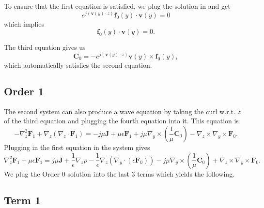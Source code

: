 \documentclass{article}
\theoremstyle{plain}
\begin{document}
To ensure that the first equation is satisfied, we plug the solution in and get
\begin{equation}
	e^{j\left(\mathbf{v}(y)\cdot z\right)}\mathbf{f}_0(y)\cdot\mathbf{v}(y) = 0
\end{equation}
which implies
\begin{equation}
	\mathbf{f}_0(y)\cdot\mathbf{v}(y) = 0.
\end{equation}

The third equation gives us
\begin{equation}
	\mathbf{C}_0 = -e^{j\left(\mathbf{v}(y)\cdot z\right)}\mathbf{v}(y)\times\mathbf{f}_0(y),
\end{equation}
which automatically satisfies the second equation.



\subsection{Order 1}

The second system can also produce a wave equation by taking the curl w.r.t. $z$ of the third equation and plugging the fourth equation into it. This equation is
\begin{equation}
	-\nabla_z^2\mathbf{F}_1 + \nabla_z\left(\nabla_z\cdot\mathbf{F}_1\right) = -j\mu\mathbf{J} + \mu\epsilon\mathbf{F}_1 + j\mu\nabla_y\times\left(\frac{1}{\mu}\mathbf{C}_0\right) - \nabla_z\times\nabla_y\times\mathbf{F}_0.
\end{equation}
Plugging in the first equation in the system gives
\begin{equation}
	\nabla_z^2\mathbf{F}_1 + \mu\epsilon\mathbf{F}_1 = j\mu\mathbf{J} + \frac{1}{\epsilon}\nabla_z\rho - \frac{1}{\epsilon}\nabla_z\left(\nabla_y\cdot\left(\epsilon\mathbf{F}_0\right)\right) - j\mu\nabla_y\times\left(\frac{1}{\mu}\mathbf{C}_0\right) + \nabla_z\times\nabla_y\times\mathbf{F}_0.
\end{equation}
We plug the Order 0 solution into the last 3 terms which yields the following.

\subsection{Term 1}
\end{document}
